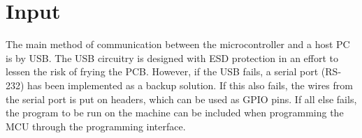 \documentclass[../main/report.tex]{subfiles}
\begin{document}
\section{Input}

The main method of communication between the microcontroller and a host PC is by USB.
The USB circuitry is designed with ESD protection in an effort to lessen the risk of frying the PCB.
However, if the USB fails, a serial port (RS-232) has been implemented as a backup solution.
If this also fails, the wires from the serial port is put on headers, which can be used as GPIO pins.
If all else fails, the program to be run on the machine can be included when programming the MCU through the programming interface. 
\end{document}
